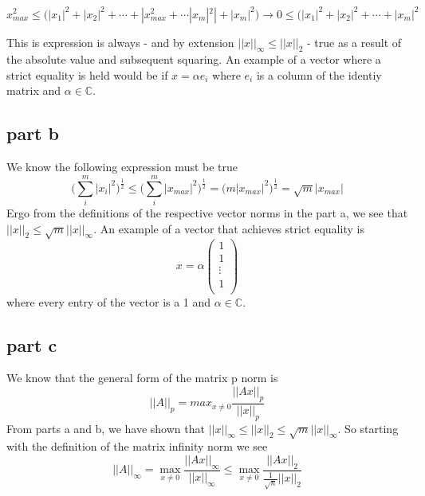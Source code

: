 \documentclass[a4paper,12pt]{article}
\begin{document}
\begin{equation}
x_{max}^2\leq \big( |x_1|^2+|x_2|^2+\cdots+|x_{max}^2 + \cdots |x_m|^2| + |x_m|^2\big) \rightarrow 0 \leq \big( |x_1|^2+|x_2|^2+\cdots+|x_{m}|^2
\end{equation}

This is expression is always - and by extension $||x||_{\infty} \leq ||x||_2$  - true as a result of the absolute value and subsequent squaring. An example of a vector where a strict equality is held would be if $x=\alpha e_i$ where $e_i$ is a column of the identiy matrix and $\alpha \in \mathbb{C}$. 

\subsection{part b}
We know the following expression must be true
\begin{equation}
\big( \sum_{i}^m |x_i|^2\big)^{\frac{1}{2}} \leq \big(\sum_i^m |x_{max}|^2   \big)^{\frac{1}{2}} = \big( m|x_{max}|^2\big)^{\frac{1}{2}} =\sqrt{m}|x_{max}|
\end{equation}
Ergo from the definitions of the respective vector norms in the part a, we see that $||x||_2 \leq \sqrt{m}||x||_{\infty}$. An example of a vector that achieves strict equality is
\begin{equation}
x=\alpha \begin{pmatrix}
1  \\
1\\
\vdots \\
1\\
\end{pmatrix}
\end{equation} where every entry of the vector is a 1 and $\alpha \in \mathbb{C}$. 


\subsection{part c}
We know that the general form of the matrix p norm is
\begin{equation}
||A||_p = max_{x\neq 0} \frac{|| Ax ||_p}{|| x||_p}
\end{equation}
From parts a and b, we have shown that $||x||_{\infty} \leq ||x||_2 \leq \sqrt m||x||_{\infty}$. So starting with the definition of the matrix infinity norm we see
\begin{equation}
||A||_{\infty}=\max_{x\neq0} \frac{||Ax||_{\infty}}{||x||_{\infty}} \leq \max_{x\neq 0}  \frac{||Ax||_2}{\frac{1}{\sqrt n}||x||_2}
\end{equation}
\end{document}
